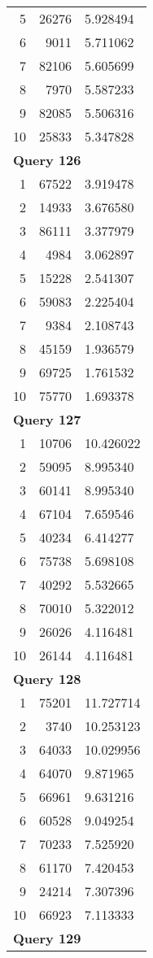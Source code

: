 \begin{longtable}[{p}]{@{}rrp{}@{}}
5 & 26276 & 5.928494 \\
6 & 9011 & 5.711062 \\
7 & 82106 & 5.605699 \\
8 & 7970 & 5.587233 \\
9 & 82085 & 5.506316 \\
10 & 25833 & 5.347828 \\
\midrule
\multicolumn{3}{l}{\bfseries Query 126} \\
1 & 67522 & 3.919478 \\
2 & 14933 & 3.676580 \\
3 & 86111 & 3.377979 \\
4 & 4984 & 3.062897 \\
5 & 15228 & 2.541307 \\
6 & 59083 & 2.225404 \\
7 & 9384 & 2.108743 \\
8 & 45159 & 1.936579 \\
9 & 69725 & 1.761532 \\
10 & 75770 & 1.693378 \\
\midrule
\multicolumn{3}{l}{\bfseries Query 127} \\
1 & 10706 & 10.426022 \\
2 & 59095 & 8.995340 \\
3 & 60141 & 8.995340 \\
4 & 67104 & 7.659546 \\
5 & 40234 & 6.414277 \\
6 & 75738 & 5.698108 \\
7 & 40292 & 5.532665 \\
8 & 70010 & 5.322012 \\
9 & 26026 & 4.116481 \\
10 & 26144 & 4.116481 \\
\midrule
\multicolumn{3}{l}{\bfseries Query 128} \\
1 & 75201 & 11.727714 \\
2 & 3740 & 10.253123 \\
3 & 64033 & 10.029956 \\
4 & 64070 & 9.871965 \\
5 & 66961 & 9.631216 \\
6 & 60528 & 9.049254 \\
7 & 70233 & 7.525920 \\
8 & 61170 & 7.420453 \\
9 & 24214 & 7.307396 \\
10 & 66923 & 7.113333 \\
\midrule
\multicolumn{3}{l}{\bfseries Query 129} \\

\end{longtable}
